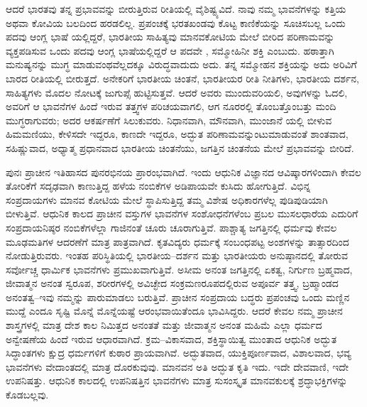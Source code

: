 ಆದರೆ ಭಾರತವು ತನ್ನ ಪ್ರಭಾವವನ್ನು ಬೀರುತ್ತಿರುವ ರೀತಿಯಲ್ಲಿ ವೈಶಿಷ್ಟ್ಯವಿದೆ. ನಾವು ನಮ್ಮ ಭಾವನೆಗಳನ್ನು ಕತ್ತಿಯ ಅಥವಾ ಕೋವಿಯ ಬಲದಿಂದ ಹರಡಲಿಲ್ಲ. ಪ್ರಪಂಚಕ್ಕೆ ಭರತಖಂಡವು ಕೊಟ್ಟ ಕಾಣಿಕೆಯನ್ನು ಸೂಚಿಸಬಲ್ಲ ಒಂದು ಪದವು ಆಂಗ್ಲ ಭಾಷೆ\- ಯಲ್ಲಿದ್ದರೆ, ಭಾರತೀಯ ಸಾಹಿತ್ಯವು ಮಾನವಕೋಟಿಯ ಮೇಲೆ ಬೀರಿದ ಪರಿಣಾಮವನ್ನು ವ್ಯಕ್ತಪಡಿಸುವ ಒಂದು ಪದವು ಆಂಗ್ಲ ಭಾಷೆಯಲ್ಲಿದ್ದರೆ ಆ ಪದವೇ , ಸಮ್ಮೋಹಿನೀ ಶಕ್ತಿ ಎಂಬುದು. ಹಠಾತ್ತಾಗಿ ಮನುಷ್ಯನನ್ನು ಮುಗ್ಧ ಮಾಡುವಂಥವೆಲ್ಲದಕ್ಕೂ ವಿರುದ್ಧವಾದುದು ಅದು. ತನ್ನ ಸಮ್ಮೋಹನ ಶಕ್ತಿಯನ್ನು ಅದು ಅರಿವಿಗೆ ಬಾರದ ರೀತಿಯಲ್ಲಿ ಬೀರುತ್ತದೆ. ಅನೇಕರಿಗೆ ಭಾರತೀಯ ಚಿಂತನೆ, ಭಾರತೀಯರ ರೀತಿ ನೀತಿಗಳು, ಭಾರತೀಯ ದರ್ಶನ, ಸಾಹಿತ್ಯಗಳು ಮೊದಲ ನೋಟಕ್ಕೆ ಜುಗುಪ್ಸೆ ಹುಟ್ಟಿಸುತ್ತವೆ. ಆದರೆ ಅವರು ಮುಂದುವರಿಯಲಿ, ಅವುಗಳನ್ನು ಓದಲಿ, ಅವರಿಗೆ ಆ ಭಾವನೆಗಳ ಹಿಂದೆ ಇರುವ ತತ್ತ್ವಗಳ ಪರಿಚಯವಾಗಲಿ, ಆಗ ನೂರರಲ್ಲಿ ತೊಂಬತ್ತೊಂಬತ್ತು ಮಂದಿ ಮುಗ್ಧರಾಗುವರು; ಅದರ ಆಕರ್ಷಣೆಗೆ ಸಿಲುಕುವರು. ನಿಧಾನವಾಗಿ, ಮೌನವಾಗಿ, ಮುಂಜಾನೆ\- ಯಲ್ಲಿ ಬೀಳುವ ಹಿಮಮಣಿಯು, ಕೇಳಿಸದೇ ಇದ್ದರೂ, ಕಾಣದೇ ಇದ್ದರೂ, ಅದ್ಭುತ ಪರಿಣಾಮವನ್ನುಂಟುಮಾಡುವಂತೆ ಶಾಂತವಾದ, ಸಹಿಷ್ಣುವಾದ, ಅಧ್ಯಾತ್ಮ ಪ್ರಧಾನವಾದ ಭಾರತೀಯ ಚಿಂತನೆಯು, ಜಗತ್ತಿನ ಚಿಂತನೆಯ ಮೇಲೆ ಪ್ರಭಾವವನ್ನು ಬೀರಿದೆ.

ಪುನಃ ಪ್ರಾಚೀನ ಇತಿಹಾಸದ ಪುನರಭಿನಯ ಪ್ರಾರಂಭವಾಗಿದೆ. ಇಂದು ಆಧುನಿಕ ವಿಜ್ಞಾನದ ಆವಿಷ್ಕಾರಗಳಿಂದಾಗಿ ಕೇವಲ ತೋರಿಕೆಗೆ ಸದೃಢವಾಗಿ ಕಾಣುತ್ತಿದ್ದ ಹಳೆಯ ನಂಬಿಕೆಗಳ ಅಡಿಪಾಯವೇ ಕುಸಿದು ಹೋಗುತ್ತಿದೆ. ವಿಭಿನ್ನ ಸಂಪ್ರದಾಯಗಳು ಮಾನವ ಕೋಟಿಯ ಮೇಲೆ ಸ್ಥಾಪಿಸುತ್ತಿದ್ದ ತಮ್ಮ ವಿಶೇಷ ಅಧಿಕಾರಗಳೆಲ್ಲ ಪುಡಿಪುಡಿಯಾಗಿ ಬೀಳುತ್ತಿವೆ. ಆಧುನಿಕ ಕಾಲದ ಪ್ರಾಚೀನ ವಸ್ತುಗಳ ಭಾವನೆಗಳ ಸಂಶೋಧನೆಗಳೆಂಬ ಪ್ರಬಲ ಮುಸಲಧಾರೆಯ ಎದುರಿಗೆ ಸಂಪ್ರದಾಯನಿಷ್ಠರ ನಂಬಿಕೆಗಳೆಲ್ಲಾ ಗಾಜಿನಂತೆ ಚೂರು ಚೂರಾಗುತ್ತಿವೆ. ಪಾಶ್ಚಾತ್ಯ ಜಗತ್ತಿನಲ್ಲಿ ಧರ್ಮವು ಕೇವಲ ಮೂಢಮತಿಗಳ ಆದರಣೆಗೆ ಮಾತ್ರ ಪಾತ್ರವಾಗಿದೆ. ಕೃತವಿದ್ಯರು ಧರ್ಮಕ್ಕೆ ಸಂಬಂಧಪಟ್ಟ ಅಂಶಗಳನ್ನು ತಾತ್ಸಾರದಿಂದ ನೋಡುತ್ತಿರುವರು. ಇಂತಹ ಪರಿಸ್ಥಿತಿಯಲ್ಲಿ ಭಾರತೀಯ–ದರ್ಶನ ಮತ್ತು ಭಾರತೀಯರು ಅನುಷ್ಠಾನದಲ್ಲಿ ತೋರುವ ಸರ್ವೋಚ್ಚ ಧಾರ್ಮಿಕ ಭಾವನೆಗಳು ಪ್ರಮುಖವಾಗುತ್ತಿವೆ. ಅಸೀಮ ಅನಂತ ಜಗತ್ತಿನಲ್ಲಿ ಏಕತ್ವ, ನಿರ್ಗುಣ ಬ್ರಹ್ಮವಾದ, ಜೀವಾತ್ಮನ ಅನಂತ ಸ್ವರೂಪ, ಶರೀರಗಳಲ್ಲಿ ಅವಿಚ್ಛೇದ ಸಂಕ್ರಮಣರೂಪದಲ್ಲಿರುವ ಅಪೂರ್ವ ತತ್ತ್ವ, ಬ್ರಹ್ಮಾಂಡದ ಅನಂತತ್ವ–ಇವು ನಮ್ಮನ್ನು ಪಾರುಮಾಡಲು ಬರುತ್ತಿವೆ. ಪ್ರಾಚೀನ ಸಂಪ್ರದಾಯ ಬದ್ಧರು ಪ್ರಪಂಚವು ಒಂದು ಮಣ್ಣಿನ ಮುದ್ದೆ ಎಂದೂ ಸೃಷ್ಟಿ ಮೊನ್ನೆ ಮೊನ್ನೆಯಷ್ಟೆ ಆರಂಭವಾಯಿತೆಂದೂ ಭಾವಿಸಿದ್ದರು. ಆದರೆ ಕೇವಲ ನಮ್ಮ ಪ್ರಾಚೀನ ಶಾಸ್ತ್ರಗಳಲ್ಲಿ ಮಾತ್ರ ದೇಶ ಕಾಲ ನಿಮಿತ್ತದ ಅನಂತತೆ ಮತ್ತು ಜೀವಾತ್ಮನ ಅನಂತ ಮಹಿಮೆ ಎಲ್ಲಾ ಧರ್ಮದ ಅನ್ವೇಷಣೆಯ ಹಿಂದೆ ಇರುವ ಆಧಾರವಾಗಿದೆ. ಕ್ರಮ–ವಿಕಾಸವಾದ, ಶಕ್ತಿಸ್ಥಾಯಿತ್ವ\break {} ಮುಂತಾದ ಆಧುನಿಕ ಅದ್ಭುತ ಸಿದ್ಧಾಂತಗಳು ಕ್ಷುದ್ರ ಧರ್ಮಗಳಿಗೆ ಕುಠಾರ ಪ್ರಾಯವಾಗಿವೆ. ಅದ್ಭುತವಾದ, ಯುಕ್ತಿಪೂರ್ಣವಾದ, ವಿಶಾಲವಾದ, ಭವ್ಯ ಭಾವನೆಗಳು ವೇದಾಂತದಲ್ಲಿ ಮಾತ್ರ ದೊರಕುವುವು. ಮಾನವನ ಅತಿ ಅದ್ಭುತ ಕೃತಿ ಇದು. ಇದೇ ದೇವವಾಣಿ, ಇದೇ ಉಪನಿಷತ್ತು. ಆಧುನಿಕ ಕಾಲದಲ್ಲಿ ಉಪನಿಷತ್ತಿನ ಭಾವನೆಗಳು ಮಾತ್ರ ಸುಸಂಸ್ಕೃತ ಮಾನವಕುಲಕ್ಕೆ ಶ್ರದ್ಧಾಭಕ್ತಿಗಳನ್ನು ಕೊಡಬಲ್ಲವು.

